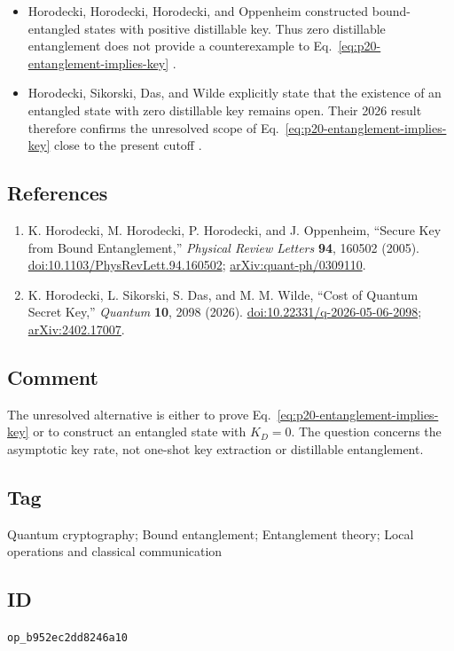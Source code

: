 \begin{itemize}
  \item Horodecki, Horodecki, Horodecki, and Oppenheim constructed
  bound-entangled states with positive distillable key.  Thus zero
  distillable entanglement does not provide a counterexample to
  Eq.~\eqref{eq:p20-entanglement-implies-key}
  .

  \item Horodecki, Sikorski, Das, and Wilde explicitly state that the
  existence of an entangled state with zero distillable key remains open.
  Their 2026 result therefore confirms the unresolved scope of
  Eq.~\eqref{eq:p20-entanglement-implies-key} close to the present cutoff
  .
\end{itemize}

\subsection*{References}

\begin{enumerate}[label={},leftmargin=4.8em,labelsep=0.5em]
  \footnotesize
  \item[\textup{[HHHO05]}]\label{ref:p20-bound-key}
  K. Horodecki, M. Horodecki, P. Horodecki, and J. Oppenheim,
  ``Secure Key from Bound Entanglement,''
  \emph{Physical Review Letters} \textbf{94}, 160502 (2005).
  \href{https://doi.org/10.1103/PhysRevLett.94.160502}{doi:10.1103/PhysRevLett.94.160502};
  \href{https://arxiv.org/abs/quant-ph/0309110}{arXiv:quant-ph/0309110}.

  \item[\textup{[HSDW26]}]\label{ref:p20-key-cost}
  K. Horodecki, L. Sikorski, S. Das, and M. M. Wilde,
  ``Cost of Quantum Secret Key,'' \emph{Quantum} \textbf{10}, 2098 (2026).
  \href{https://doi.org/10.22331/q-2026-05-06-2098}{doi:10.22331/q-2026-05-06-2098};
  \href{https://arxiv.org/abs/2402.17007}{arXiv:2402.17007}.
\end{enumerate}

\subsection*{Comment}

The unresolved alternative is either to prove
Eq.~\eqref{eq:p20-entanglement-implies-key} or to construct an entangled state
with $K_D=0$.  The question concerns the asymptotic key rate, not one-shot key
extraction or distillable entanglement.

\subsection*{Tag}

Quantum cryptography; Bound entanglement; Entanglement theory;
Local operations and classical communication

\subsection*{ID}

\texttt{op\_b952ec2dd8246a10}
